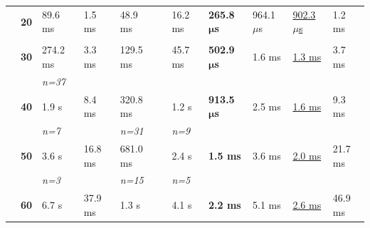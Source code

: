 \documentclass{juliacon}
\numberwithin{equation}{section}
\begin{document}
\begin{table}
\begin{tabular*}{\linewidth}{@{\extracolsep{\fill}} cllllllllll}
                                & \textbf{20} & 89.6 ms           & 1.5 ms                      & 48.9 ms             & & 16.2 ms          & \textbf{265.8 \( \bm{\mu} \)s}&  964.1 \( \mu \)s               & \underline{902.3 \( \mu \)s} & 1.2 ms               \\
                                &             &                   &                             &                     & &                  &                               &                                 &                              &                              \\
                                & \textbf{30} & 274.2 ms          & 3.3 ms                      & 129.5 ms            & & 45.7 ms          & \textbf{502.9 \( \bm{\mu} \)s}&  1.6 ms                         & \underline{1.3 ms}           & 3.7 ms                       \\
                                &             & \textit{n=37}     &                             &                     & &                  &                               &                                 &                              &                              \\
                                & \textbf{40} & 1.9 s             & 8.4 ms                      & 320.8 ms            & & 1.2 s            & \textbf{913.5 \( \bm{\mu} \)s}&  2.5 ms                         & \underline{1.6 ms}           & 9.3 ms                       \\
                                &             & \textit{n=7}      &                             & \textit{n=31}       & & \textit{n=9}     &                               &                                 &                              &                              \\
                                & \textbf{50} & 3.6 s             & 16.8 ms                     & 681.0 ms            & & 2.4 s            & \textbf{1.5 ms}               &  3.6 ms                         & \underline{2.0 ms}           & 21.7 ms                      \\
                                &             & \textit{n=3}      &                             & \textit{n=15}       & & \textit{n=5}     &                               &                                 &                              &                              \\
                                & \textbf{60} & 6.7 s             & 37.9 ms                     & 1.3 s               & & 4.1 s            & \textbf{2.2 ms}               &  5.1 ms                         & \underline{2.6 ms}           & 46.9 ms                      \\

\end{tabular*}
\end{table}
\end{document}
